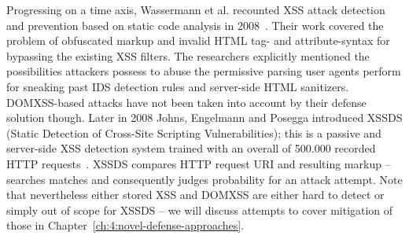 \begin{itemize}
      Progressing on a time axis, Wassermann et al. recounted XSS attack detection and prevention based on static code analysis in 2008~\cite{wassermann2008static}. Their work covered the problem of obfuscated markup and invalid HTML tag- and attribute-syntax for bypassing the existing XSS filters. The researchers explicitly mentioned the possibilities attackers possess to abuse the permissive parsing user agents perform for sneaking past IDS detection rules and server-side HTML sanitizers. DOMXSS-based attacks have not been taken into account by their defense solution though. Later in 2008 Johns, Engelmann and Posegga introduced XSSDS (Static Detection of Cross-Site Scripting Vulnerabilities); this is a passive and server-side XSS detection system trained with an overall of 500.000 recorded HTTP requests~\cite{johns2008xssds}. XSSDS compares HTTP request URI and resulting markup -- searches matches and consequently judges probability for an attack attempt. Note that nevertheless either stored XSS and DOMXSS are either hard to detect or simply out of scope for XSSDS -- we will discuss attempts to cover mitigation of those in Chapter~\ref{ch:4:novel-defense-approaches}. \\


\end{itemize}
